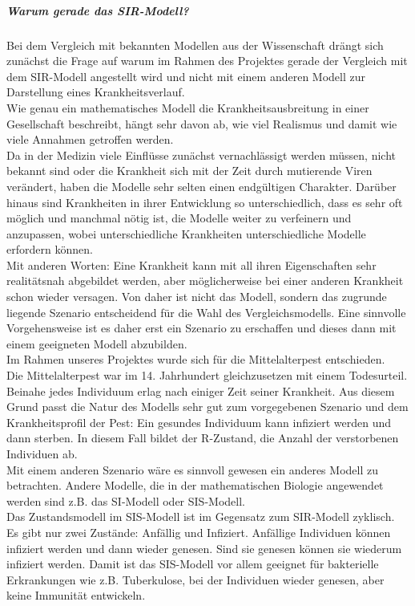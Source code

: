 \subparagraph{Warum gerade das SIR-Modell?}
Bei dem Vergleich mit bekannten Modellen aus der Wissenschaft drängt sich zunächst die Frage auf warum im Rahmen des Projektes gerade der Vergleich mit dem SIR-Modell angestellt wird und nicht mit einem anderen Modell zur Darstellung eines Krankheitsverlauf.\\
Wie genau ein mathematisches Modell die Krankheitsausbreitung in einer Gesellschaft beschreibt, hängt sehr davon ab, wie viel Realismus und damit wie viele Annahmen getroffen werden.\\
Da in der Medizin viele Einflüsse zunächst vernachlässigt werden müssen, nicht bekannt sind oder die Krankheit sich mit der Zeit durch mutierende Viren verändert, haben die Modelle sehr selten einen endgültigen Charakter. Darüber hinaus sind Krankheiten in ihrer Entwicklung so unterschiedlich, dass es sehr oft möglich und manchmal nötig ist, die Modelle weiter zu verfeinern und anzupassen, wobei unterschiedliche Krankheiten unterschiedliche Modelle erfordern können. 
\cite{sebM}\\
Mit anderen Worten: Eine Krankheit kann mit all ihren Eigenschaften sehr realitätsnah abgebildet werden, aber möglicherweise bei einer anderen Krankheit schon wieder versagen. Von daher ist nicht das Modell, sondern das zugrunde liegende Szenario entscheidend für die Wahl des Vergleichsmodells. Eine sinnvolle Vorgehensweise ist es daher erst ein Szenario zu erschaffen und dieses dann mit einem geeigneten Modell abzubilden.\\ 
Im Rahmen unseres Projektes wurde sich für die Mittelalterpest entschieden.\\ 
Die Mittelalterpest war im 14. Jahrhundert gleichzusetzen mit einem Todesurteil. Beinahe jedes Individuum erlag nach einiger Zeit seiner Krankheit. Aus diesem Grund passt die Natur des Modells sehr gut zum vorgegebenen Szenario und dem Krankheitsprofil der Pest: Ein gesundes Individuum kann infiziert werden und dann sterben. In diesem Fall bildet der \glqq R\grqq-Zustand, die Anzahl der verstorbenen Individuen ab.\\
Mit einem anderen Szenario wäre es sinnvoll gewesen ein anderes Modell zu betrachten. 
Andere Modelle, die in der mathematischen Biologie angewendet werden sind z.B. das SI-Modell oder SIS-Modell.\\
Das Zustandsmodell im SIS-Modell ist im Gegensatz zum SIR-Modell zyklisch. Es gibt nur zwei Zustände: Anfällig und Infiziert. Anfällige Individuen können infiziert werden und dann wieder genesen. Sind sie genesen können sie wiederum infiziert werden. Damit ist das SIS-Modell vor allem geeignet für bakterielle Erkrankungen wie z.B. Tuberkulose, bei der Individuen wieder genesen, aber keine Immunität entwickeln. \\
